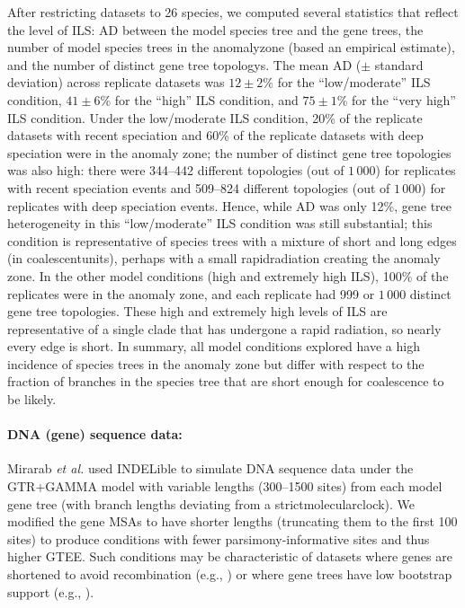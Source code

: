 After restricting datasets to 26 species, we computed several statistics that reflect the level of ILS: \gls{AD} between the model species tree and the gene trees, the number of model species trees in the \gls{anomalyzone} (based an empirical estimate), and the number of distinct gene tree \glspl{topology}.
The mean AD ($\pm$ standard deviation) across replicate datasets was $12 \pm 2$\% for the ``low/moderate'' ILS  condition, $41\pm6$\% for the ``high'' ILS condition, and $75\pm1$\% for the  ``very high'' ILS condition.
Under the low/moderate ILS condition, 20\% of the replicate datasets with recent speciation and 60\% of the replicate datasets with deep speciation were in the anomaly zone; the number of distinct gene tree topologies was also high: there were 344--442 different topologies (out of $1\,000$) for replicates with recent speciation events and 509--824 different topologies (out of $1\,000$) for replicates with deep speciation events.
Hence, while AD was only 12\%, gene tree heterogeneity in this ``low/moderate'' ILS condition was still substantial; this condition is representative of species trees with a mixture of short and long edges (in \glspl{coalescentunit}), perhaps with a small \gls{rapidradiation} creating the anomaly zone.
In the other model conditions (high and extremely high ILS), 100\% of the replicates were in the anomaly zone, and each replicate had 999 or $1\,000$ distinct gene tree topologies.
These high and extremely high levels of ILS are representative of a single clade that has undergone a rapid radiation, so nearly every edge is short.
In summary, all model conditions explored have a high incidence of species trees in the anomaly zone but differ with respect to the fraction of branches in the species tree that are short enough for coalescence to be likely.

\paragraph{DNA (gene) sequence data:} Mirarab {\em et al.} \cite{mirarab2015astral2} used \gls{INDELible} \cite{fletcher2009indelible} to simulate DNA sequence data under the \gls{GTR+GAMMA} model with variable lengths (300--1500 sites) from each model gene tree (with branch lengths deviating from a \gls{strictmolecularclock}).
We modified the gene \glspl{MSA} to have shorter lengths (truncating them to the first 100 sites) to produce conditions with fewer \gls{parsimony-informative} sites and thus higher GTEE. 
Such conditions may be characteristic of datasets where genes are shortened to avoid \gls{recombination} (e.g., \cite{hobolth2011incomplete}) or where gene trees have low bootstrap support (e.g., \cite{jarvis2014whole, wickett2014phylo, hosner2016empirical, blom2017accounting}). 

